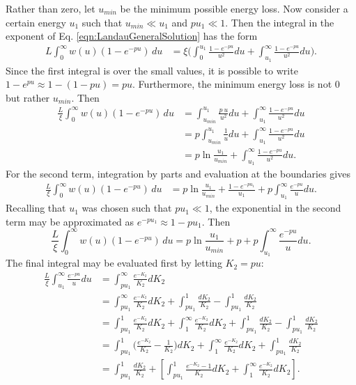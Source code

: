 Rather than zero, let $u_{min}$ be the minimum possible energy loss. Now consider a certain energy $u_1$ such that $u_{min}\ll u_1$ and $pu_1 \ll 1$. Then the integral in the exponent of Eq. \eqref{eqn:LandauGeneralSolution} has the form
\begin{align*}
L\int_0 ^\infty w(u)  (1-e^{-pu})\, du &= \xi\Big( \int_0 ^{u_1} \frac{1-e^{-pu}}{u^2} du + \int_{u_1} ^\infty \frac{1-e^{-pu}}{u^2} du\Big) .
\end{align*}
Since the first integral is over the small values, it is possible to write $1-e^{pu} \approx 1-(1-pu) = pu$. Furthermore, the minimum energy loss is not 0 but rather $u_{min}$. Then
\begin{align*}
\frac{L}{\xi}\int_0 ^\infty w(u)  (1-e^{-pu})\, du &=\int_{u_{min}} ^{u_1} \frac{p\ u}{u^2} du + \int_{u_1} ^\infty \frac{1-e^{-pu}}{u^2} du\\
&=p\int_{u_{min}} ^{u_1} \frac{1}{u} du + \int_{u_1} ^\infty \frac{1-e^{-pu}}{u^2} du\\
&=p \ln\frac{u_1}{u_{min}} + \int_{u_1} ^\infty \frac{1-e^{-pu}}{u^2} du.
\end{align*}
For the second term, integration by parts and evaluation at the boundaries gives
\begin{align*}
\frac{L}{\xi}\int_0 ^\infty w(u)  (1-e^{-pu})\, du &=p \ln\frac{u_1}{u_{min}} + \frac{1-e^{-pu_1}}{u_1}+p\int_{u_1}^\infty \frac{e^{-pu}}{u} du.
\end{align*}
Recalling that $u_1$ was chosen such that $pu_1 \ll 1$, the exponential in the second term may be approximated as $e^{-pu_1}\approx 1-pu_1$. Then
\begin{equation} \label{eqn:landauIntermediate1}
\frac{L}{\xi}\int_0 ^\infty w(u)  (1-e^{-pu})\, du =p \ln\frac{u_1}{u_{min}} + p+p\int_{u_1}^\infty \frac{e^{-pu}}{u} du.
\end{equation}
The final integral may be evaluated first by letting $K_2=pu$:
\begin{align*}
\frac{L}{\xi}\int_{u_1}^\infty \frac{e^{-pu}}{u} du &= \int _{pu_1} ^\infty \frac{e^{-K_2}}{K_2}dK_2\\
&= \int_{pu_1} ^\infty \frac{e^{-K_2}}{K_2} dK_2 + \int_{pu_1} ^1 \frac{dK_2}{K_2} - \int_{pu_1} ^1 \frac{dK_2}{K_2} \\
&= \int_{pu_1} ^1 \frac{e^{-K_2}}{K_2} dK_2 + \int_1 ^\infty \frac{e^{-K_2}}{K_2} dK_2 + \int_{pu_1} ^1 \frac{dK_2}{K_2} - \int_{pu_1} ^1 \frac{dK_2}{K_2} \\
&= \int_{pu_1} ^1 \Big(\frac{e^{-K_2}}{K_2}-\frac{1}{K_2}\Big) dK_2 + \int_1 ^\infty \frac{e^{-K_2}}{K_2} dK_2 + \int_{pu_1} ^1 \frac{dK_2}{K_2} \\
&= \int_{pu_1} ^1 \frac{dK_2}{K_2} + \left[\int_{pu_1} ^1 \frac{e^{-K_2}-1}{K_2} dK_2 + \int_1 ^\infty \frac{e^{-K_2}}{K_2} dK_2 \right].
\end{align*}

